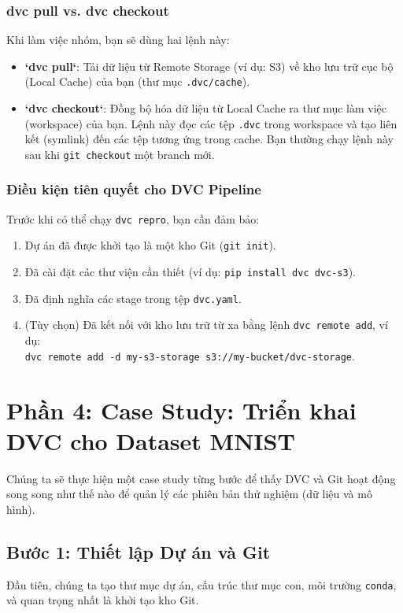 \documentclass[11pt]{article}
\begin{document}
\subsubsection{dvc pull vs. dvc checkout}
Khi làm việc nhóm, bạn sẽ dùng hai lệnh này:
\begin{itemize}
    \item \textbf{`dvc pull`}: Tải dữ liệu từ Remote Storage (ví dụ: S3) về kho lưu trữ cục bộ (Local Cache) của bạn (thư mục \texttt{.dvc/cache}).
    \item \textbf{`dvc checkout`}: Đồng bộ hóa dữ liệu từ Local Cache ra thư mục làm việc (workspace) của bạn. Lệnh này đọc các tệp \texttt{.dvc} trong workspace và tạo liên kết (symlink) đến các tệp tương ứng trong cache. Bạn thường chạy lệnh này sau khi \texttt{git checkout} một branch mới.
\end{itemize}

\subsubsection{Điều kiện tiên quyết cho DVC Pipeline}
Trước khi có thể chạy \texttt{dvc repro}, bạn cần đảm bảo:
\begin{enumerate}
    \item Dự án đã được khởi tạo là một kho Git (\texttt{git init}).
    \item Đã cài đặt các thư viện cần thiết (ví dụ: \texttt{pip install dvc dvc-s3}).
    \item Đã định nghĩa các stage trong tệp \texttt{dvc.yaml}.
    \item (Tùy chọn) Đã kết nối với kho lưu trữ từ xa bằng lệnh \texttt{dvc remote add}, ví dụ: \\ \texttt{dvc remote add -d my-s3-storage s3://my-bucket/dvc-storage}.
\end{enumerate}

\section{Phần 4: Case Study: Triển khai DVC cho Dataset MNIST}
Chúng ta sẽ thực hiện một case study từng bước để thấy DVC và Git hoạt động song song như thế nào để quản lý các phiên bản thử nghiệm (dữ liệu và mô hình).

\subsection{Bước 1: Thiết lập Dự án và Git}
Đầu tiên, chúng ta tạo thư mục dự án, cấu trúc thư mục con, môi trường \texttt{conda}, và quan trọng nhất là khởi tạo kho Git.
\end{document}
